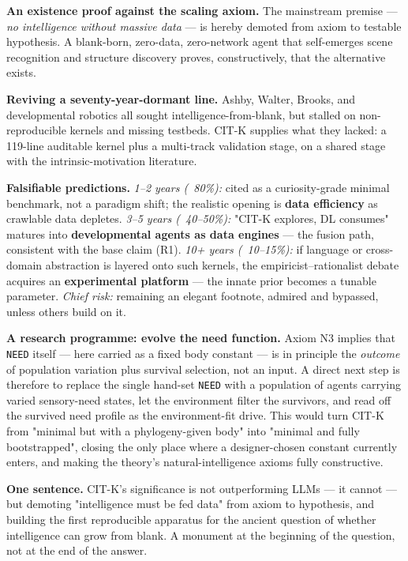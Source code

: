\documentclass[11pt]{article}
\begin{document}
\textbf{An existence proof against the scaling axiom.} The mainstream premise — \emph{no intelligence without massive data} — is hereby demoted from axiom to testable hypothesis. A blank-born, zero-data, zero-network agent that self-emerges scene recognition and structure discovery proves, constructively, that the alternative exists.

\textbf{Reviving a seventy-year-dormant line.} Ashby, Walter, Brooks, and developmental robotics all sought intelligence-from-blank, but stalled on non-reproducible kernels and missing testbeds. CIT-K supplies what they lacked: a 119-line auditable kernel plus a multi-track validation stage, on a shared stage with the intrinsic-motivation literature.

\textbf{Falsifiable predictions.} \emph{1–2 years (~80\%):} cited as a curiosity-grade minimal benchmark, not a paradigm shift; the realistic opening is \textbf{data efficiency} as crawlable data depletes. \emph{3–5 years (~40–50\%):} "CIT-K explores, DL consumes" matures into \textbf{developmental agents as data engines} — the fusion path, consistent with the base claim (R1). \emph{10+ years (~10–15\%):} if language or cross-domain abstraction is layered onto such kernels, the empiricist–rationalist debate acquires an \textbf{experimental platform} — the innate prior becomes a tunable parameter. \emph{Chief risk:} remaining an elegant footnote, admired and bypassed, unless others build on it.

\textbf{A research programme: evolve the need function.} Axiom N3 implies that \texttt{NEED} itself — here carried as a fixed body constant — is in principle the \emph{outcome} of population variation plus survival selection, not an input. A direct next step is therefore to replace the single hand-set \texttt{NEED} with a population of agents carrying varied sensory-need states, let the environment filter the survivors, and read off the survived need profile as the environment-fit drive. This would turn CIT-K from "minimal but with a phylogeny-given body" into "minimal and fully bootstrapped", closing the only place where a designer-chosen constant currently enters, and making the theory's natural-intelligence axioms fully constructive.

\textbf{One sentence.} CIT-K's significance is not outperforming LLMs — it cannot — but demoting "intelligence must be fed data" from axiom to hypothesis, and building the first reproducible apparatus for the ancient question of whether intelligence can grow from blank. A monument at the beginning of the question, not at the end of the answer.
\end{document}
